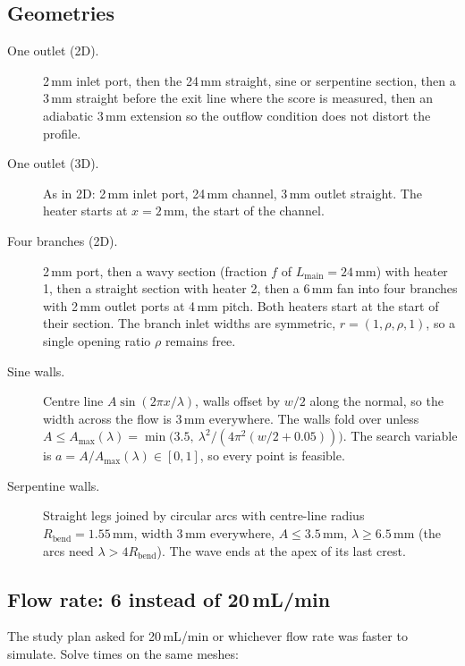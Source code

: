 \documentclass[11pt,a4paper]{article}
\newcommand{\mm}{\ensuremath{\,\mathrm{mm}}}
\begin{document}
\subsection{Geometries}
\begin{description}
  \item[One outlet (2D).] 2\mm{} inlet port, then the 24\mm{} straight, sine or serpentine section,
        then a 3\mm{} straight before the exit line where the score is measured, then an
        adiabatic 3\mm{} extension so the outflow condition does not distort the profile.
  \item[One outlet (3D).] As in 2D: 2\mm{} inlet port, 24\mm{} channel, 3\mm{} outlet straight.
        The heater starts at $x = 2\mm$, the start of the channel.
  \item[Four branches (2D).] 2\mm{} port, then a wavy section (fraction $f$ of $L_\mathrm{main} = 24\mm$)
        with heater 1, then a straight section with heater 2, then a 6\mm{} fan into four
        branches with 2\mm{} outlet ports at 4\mm{} pitch. Both heaters start at the start of their
        section. The branch inlet widths are symmetric, $r = (1, \rho, \rho, 1)$, so a single
        opening ratio $\rho$ remains free.
  \item[Sine walls.] Centre line $A\sin(2\pi x/\lambda)$, walls offset by $w/2$ along the normal,
        so the width across the flow is 3\mm{} everywhere. The walls fold over unless
        $A \le A_\mathrm{max}(\lambda) = \min\!\big(3.5,\ \lambda^2/(4\pi^2(w/2 + 0.05))\big)$.
        The search variable is $a = A/A_\mathrm{max}(\lambda) \in [0,1]$, so every point is feasible.
  \item[Serpentine walls.] Straight legs joined by circular arcs with centre-line radius
        $R_\mathrm{bend} = 1.55\mm$, width 3\mm{} everywhere, $A \le 3.5\mm$,
        $\lambda \ge 6.5\mm$ (the arcs need $\lambda > 4R_\mathrm{bend}$). The wave ends at the apex of its last crest.
\end{description}

\subsection{Flow rate: 6 instead of 20\,mL/min}
The study plan asked for 20\,mL/min or whichever flow rate was faster to simulate. Solve
times on the same meshes:
\end{document}
